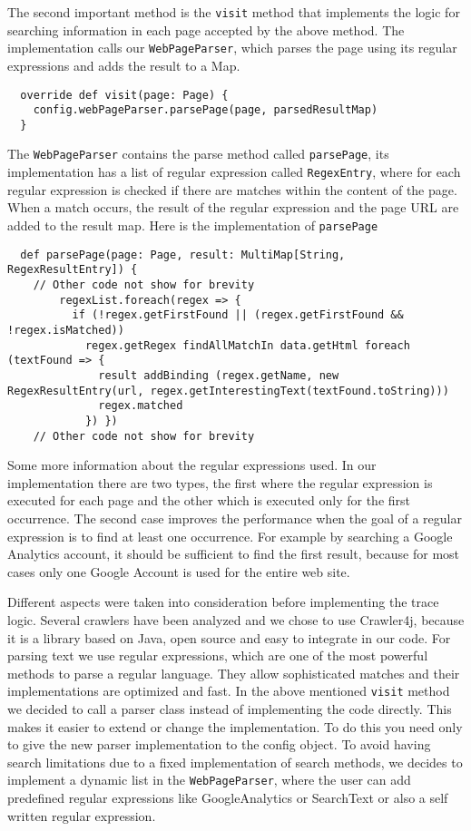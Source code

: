 \documentclass[
	a4paper,					10pt,							twoside,					openright,				notitlepage,			parskip=half,			]{scrreprt}
\begin{document}
The second important method is the \verb|visit| method that implements the logic for searching information 
in each page accepted by the above method.
The implementation calls our \verb|WebPageParser|, which parses the page using its regular expressions and adds the result to a Map.
\begin{lstlisting}
  override def visit(page: Page) {
    config.webPageParser.parsePage(page, parsedResultMap)
  }
\end{lstlisting}

The \verb|WebPageParser| contains the parse method called \verb|parsePage|, its implementation has a list of regular expression called \verb|RegexEntry|, 
where for each regular expression is checked if there are matches within the content of the page. When a match occurs, 
the result of the regular expression and the page \gls{URL} are added to the result map.
\newpage
Here is the implementation of \verb|parsePage|
\begin{lstlisting}
  def parsePage(page: Page, result: MultiMap[String, RegexResultEntry]) {
	// Other code not show for brevity
        regexList.foreach(regex => {
          if (!regex.getFirstFound || (regex.getFirstFound && !regex.isMatched))
            regex.getRegex findAllMatchIn data.getHtml foreach (textFound => {
              result addBinding (regex.getName, new RegexResultEntry(url, regex.getInterestingText(textFound.toString)))
              regex.matched
            }) })
	// Other code not show for brevity
\end{lstlisting}
Some more information about the regular expressions used. In our implementation there are two types, 
the first where the regular expression is executed for each page and the other which is executed only 
for the first occurrence. The second case improves the performance when the goal of a regular expression
is to find at least one occurrence. For example by searching a Google Analytics account,
it should be sufficient to find the first result, because for most cases only one Google Account 
is used for the entire web site.

Different aspects were taken into consideration before implementing the trace logic. 
Several crawlers have been analyzed and we chose to use Crawler4j, because it is a library based on Java,
open source and easy to integrate in our code. For parsing text we use regular expressions, 
which are one of the most powerful methods to parse a regular language. They allow sophisticated matches 
and their implementations are optimized and fast. In the above mentioned \verb|visit| method we decided
to call a parser class instead of implementing the code directly. This makes it easier to extend or change 
the implementation. To do this you need only to give the new parser implementation to the config object.
To avoid having search limitations due to a fixed implementation of search methods, we decides to implement 
a dynamic list in the \verb|WebPageParser|, where the user can add predefined regular expressions like GoogleAnalytics 
or SearchText or also a self written regular expression.
\end{document}
